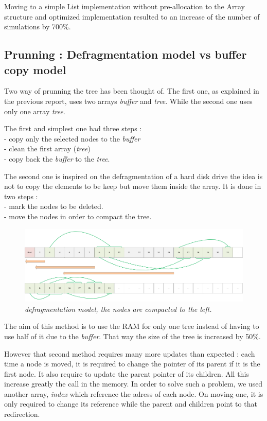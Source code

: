 Moving to a simple List implementation without pre-allocation to the Array structure and optimized implementation resulted to an increase of the number of simulations by 700\%.

\subsection{Prunning : Defragmentation model vs buffer copy model}

Two way of prunning the tree has been thought of. The first one, as  explained in the previous report, uses two arrays \textit{buffer} and \textit{tree}. While the second one uses only one array \textit{tree}.

The first and simplest one had three steps : \\
- copy only the selected nodes to the \textit{buffer} \\
- clean the first array (\textit{tree}) \\
- copy back the \textit{buffer} to the \textit{tree}.

The second one is inspired on the defragmentation of a hard disk drive the idea is not to copy the elements to be keep but move them inside the array. It is done in two steps : \\
- mark the nodes to be deleted. \\
- move the nodes in order to compact the tree. \\

\begin{figure}[H] 
\centerline{\includegraphics[width=\textwidth]{Optimisations/array.png}}
\caption{\label{fig:Defrag}\textit{defragmentation model, the nodes are compacted to the left.}}
\end{figure}

The aim of this method is to use the RAM for only one tree instead of having to use half of it due to the \textit{buffer}. That way the size of the tree is increased by 50\%.

However that second method requires many more updates than expected : 
each time a node is moved, it is required to change the pointer of its parent if it is the first node. It also require to update the parent pointer of its children. All this increase greatly the call in the memory. In order to solve such a problem, we used another array, \textit{index} which reference the adress of each node. On moving one, it is only required to change its reference while the parent and children point to that redirection.

